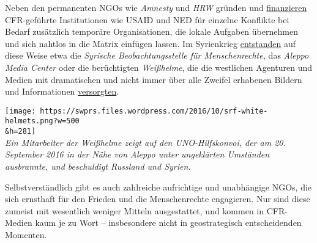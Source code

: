 Neben den permanenten NGOs wie \emph{Amnesty} und \emph{HRW} gründen und
\href{http://www.hintergrund.de/201611244160/globales/kriege/weisse-helme-ohne-weisse-westen.html}{finanzieren}
CFR-geführte Institutionen wie USAID und NED für einzelne Konflikte bei
Bedarf zusätzlich temporäre Organisationen, die lokale Aufgaben
übernehmen und sich nahtlos in die Matrix einfügen lassen. Im
Syrienkrieg
\href{http://www.globalresearch.ca/war-propaganda-and-the-aleppo-media-centre-funded-by-french-foreign-office-eu-and-us/5546925}{entstanden}
auf diese Weise etwa die \emph{Syrische Beobachtungs­stelle für
Menschen­rechte,} das \emph{Aleppo Media Center} oder die berüchtigten
\emph{Weißhelme}, die die westlichen Agenturen und Medien mit
dramatischen und nicht immer über alle Zweifel erhabenen Bildern und
Informationen
\href{http://21stcenturywire.com/2015/10/23/syrias-white-helmets-war-by-way-of-deception-part-1/}{versorgten}.

\texttt{[image: https://swprs.files.wordpress.com/2016/10/srf-white-helmets.png?w=500\\\&h=281]}\\
\emph{Ein Mitarbeiter der Weißhelme zeigt auf den UNO-Hilfskonvoi, der
am 20. September 2016 in der Nähe von Aleppo unter ungeklärten Umständen
ausbrannte, und beschuldigt Russland und Syrien.}

Selbstverständlich gibt es auch zahlreiche aufrichtige und unabhängige
NGOs, die sich ernsthaft für den Frieden und die Menschen­rechte
engagieren. Nur sind diese zumeist mit wesentlich weniger Mitteln
ausgestattet, und kommen in CFR-Medien kaum je zu Wort -- insbesondere
nicht in geostrategisch entscheidenden Momenten.

